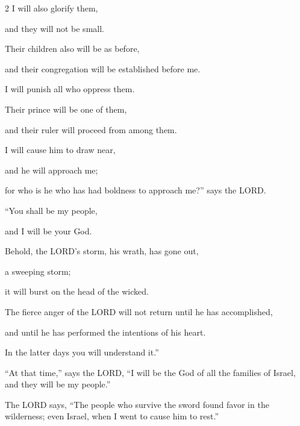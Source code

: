 \begin{multicols}{2}
I will also glorify them,

and they will not be small.


\myverse{}Their children also will be as before,

and their congregation will be established before me.

I will punish all who oppress them.


\myverse{}Their prince will be one of them,

and their ruler will proceed from among them.

I will cause him to draw near,

and he will approach me;

for who is he who has had boldness to approach me?” says the LORD.
			
			
\myverse{}“You shall be my people,

and I will be your God.


\myverse{}Behold, the LORD’s storm, his wrath, has gone out,

a sweeping storm;

it will burst on the head of the wicked.


\myverse{}The fierce anger of the LORD will not return until he has accomplished,

and until he has performed the intentions of his heart.

In the latter days you will understand it.”
			
\end{multicols}			
			
\mychapter{} \myverse*{}“At that time,” says the LORD, “I will be the God of all the families of Israel, and they will be my people.”
			
\quad \myverse{}The LORD says, “The people who survive the sword found favor in the wilderness; even Israel, when I went to cause him to rest.”
			
